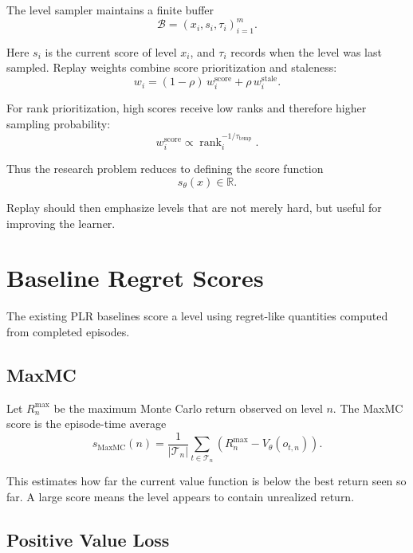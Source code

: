 \documentclass[11pt]{article}
\begin{document}
The level sampler maintains a finite buffer
\begin{equation}
  \mathcal{B} = (x_i, s_i, \tau_i)_{i=1}^{m}.
\end{equation}

Here $s_i$ is the current score of level $x_i$, and $\tau_i$ records when the
level was last sampled. Replay weights combine score prioritization and
staleness:
\begin{equation}
  w_i = (1 - \rho)\, w_i^{\mathrm{score}} + \rho\, w_i^{\mathrm{stale}}.
\end{equation}

For rank prioritization, high scores receive low ranks and therefore higher
sampling probability:
\begin{equation}
  w_i^{\mathrm{score}} \propto \operatorname{rank}_i^{-1 / \tau_{\mathrm{temp}}}.
\end{equation}

Thus the research problem reduces to defining the score function
\begin{equation}
  s_\theta(x) \in \mathbb{R}.
\end{equation}

Replay should then emphasize levels that are not merely hard, but useful for
improving the learner.

\section{Baseline Regret Scores}

The existing PLR baselines score a level using regret-like quantities computed
from completed episodes.

\subsection{MaxMC}

Let $R_n^{\max}$ be the maximum Monte Carlo return observed on level $n$. The
MaxMC score is the episode-time average
\begin{equation}
  s_{\mathrm{MaxMC}}(n)
    = \frac{1}{|\mathcal{T}_n|}
      \sum_{t \in \mathcal{T}_n}
      \left(R_n^{\max} - V_\theta(o_{t,n})\right).
\end{equation}

This estimates how far the current value function is below the best return
seen so far. A large score means the level appears to contain unrealized return.

\subsection{Positive Value Loss}
\end{document}
